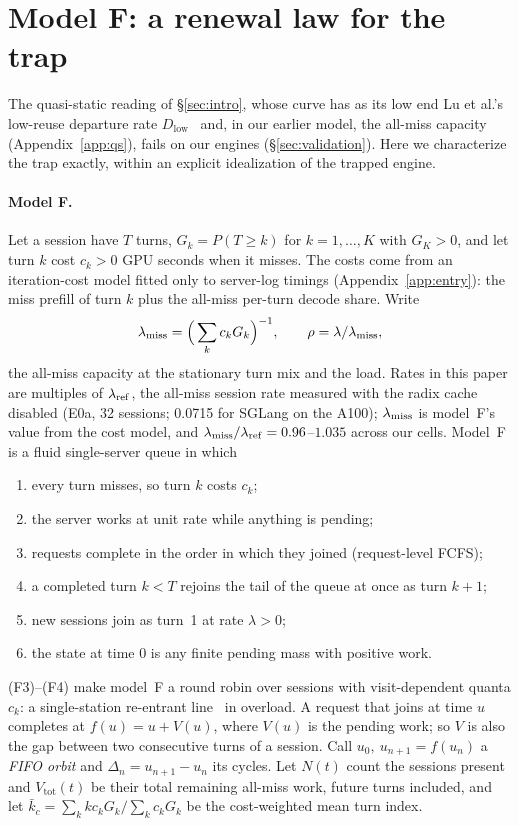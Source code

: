 \section{Model F: a renewal law for the trap}\label{sec:trap}

The quasi-static reading of \S\ref{sec:intro}, whose curve has as its low end Lu et al.'s low-reuse departure rate
$D_{\mathrm{low}}$~\citep{lu2026cachetrap} and, in our earlier model, the all-miss capacity (Appendix~\ref{app:qs}), fails on our
engines (\S\ref{sec:validation}). Here we characterize the trap exactly, within an explicit idealization of the trapped engine.

\paragraph{Model F.} Let a session have $T$ turns, $G_k=P(T\ge k)$ for $k=1,\dots,K$ with $G_K>0$, and let turn $k$ cost $c_k>0$
GPU seconds when it misses. The costs come from an iteration-cost model fitted only to server-log timings
(Appendix~\ref{app:entry}): the miss prefill of turn $k$ plus the all-miss per-turn decode share. Write
\[
\lambda_{\mathrm{miss}}=\Big(\sum_kc_kG_k\Big)^{-1},\qquad \rho=\lambda/\lambda_{\mathrm{miss}} ,
\]
the all-miss capacity at the stationary turn mix and the load. Rates in this paper are multiples of $\lambda_{\mathrm{ref}}$, the all-miss
session rate measured with the radix cache disabled (E0a, 32 sessions; 0.0715\sps{} for SGLang on the A100); $\lambda_{\mathrm{miss}}$ is model~F's
value from the cost model, and $\lambda_{\mathrm{miss}}/\lambda_{\mathrm{ref}}=0.96$--$1.035$ across our cells. Model~F is a fluid single-server queue in which
\begin{enumerate}[(F1),leftmargin=*,nosep]
\item every turn misses, so turn $k$ costs $c_k$;
\item the server works at unit rate while anything is pending;
\item requests complete in the order in which they joined (request-level FCFS);
\item a completed turn $k<T$ rejoins the tail of the queue at once as turn $k+1$;
\item new sessions join as turn~1 at rate $\lambda>0$;
\item the state at time 0 is any finite pending mass with positive work.
\end{enumerate}
(F3)--(F4) make model~F a round robin over sessions with visit-dependent quanta $c_k$: a single-station re-entrant
line~\citep{kumar1993reentrant} in overload. A request that joins at time $u$ completes at $f(u)=u+V(u)$, where $V(u)$ is the
pending work; so $V$ is also the gap between two consecutive turns of a session. Call $u_0,\ u_{n+1}=f(u_n)$ a \emph{FIFO orbit}
and $\Delta_n=u_{n+1}-u_n$ its cycles. Let $N(t)$ count the sessions present and $V_{\mathrm{tot}}(t)$ be their total remaining
all-miss work, future turns included, and let $\bar k_c=\sum_kkc_kG_k/\sum_kc_kG_k$ be the cost-weighted mean turn index.

